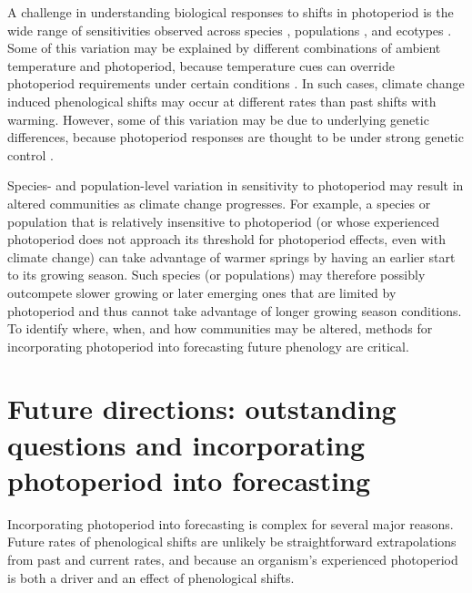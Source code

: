 \documentclass{article}
\begin{document}
\par A challenge in understanding biological responses to shifts in photoperiod is the wide range of sensitivities observed across species \citep{Sanz-Perez:2009aa, zohner2016,flynn2018}, populations \citep{tanino2010}, and ecotypes \citep{Howe:1995aa}. Some of this variation may be explained by different combinations of ambient temperature and photoperiod, because temperature cues can override photoperiod requirements under certain conditions \citep [e.g.,][] {tanino2010}. In such cases, climate change induced phenological shifts may occur at different rates than past shifts with warming. However, some of this variation may be due to underlying genetic differences, because photoperiod responses are thought to be under strong genetic control \citep{bradshaw1995,weih2004,keller2011}. 

\par Species- and population-level variation in sensitivity to photoperiod may result in altered communities as climate change progresses. For example, a species or population that is relatively insensitive to photoperiod (or whose experienced photoperiod does not approach its threshold for photoperiod effects, even with climate change) can take advantage of warmer springs by having an earlier start to its growing season. Such species (or populations) may therefore possibly outcompete slower growing or later emerging ones that are limited by photoperiod and thus cannot take advantage of longer growing season conditions. To identify where, when, and how communities may be altered, methods for incorporating photoperiod into forecasting future phenology are critical. 


\section*{Future directions: outstanding questions and incorporating photoperiod into forecasting}
\par  Incorporating photoperiod into forecasting is complex for several major reasons. Future rates of phenological shifts are unlikely be straightforward extrapolations from past and current rates, and because an organism's experienced photoperiod is both a driver and an effect of phenological shifts. 
\end{document}
